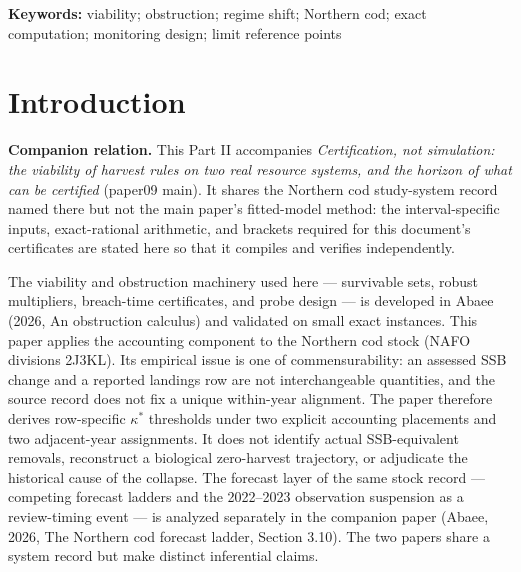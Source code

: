 \documentclass[10pt,twocolumn]{article}
\theoremstyle{plain}
\theoremstyle{remark}
\begin{document}
\textbf{Keywords:} viability; obstruction; regime shift; Northern cod;
exact computation; monitoring design; limit reference points

\section{Introduction}\label{intro}

\noindent\textbf{Companion relation.} This Part II accompanies
\emph{Certification, not simulation: the viability of harvest rules on two real resource systems,
and the horizon of what can be certified} (paper09 main). It shares the Northern cod
study-system record named there but not the main paper's fitted-model method:
the interval-specific inputs, exact-rational arithmetic, and brackets required for
this document's certificates are stated here so that it compiles and verifies independently.



The viability and obstruction machinery used here --- survivable
sets, robust multipliers, breach-time certificates, and probe design ---
is developed in Abaee (2026, An obstruction calculus) and validated on
small exact instances. This paper applies the accounting component to
the Northern cod stock (NAFO divisions 2J3KL). Its empirical issue is
one of commensurability: an assessed SSB change and a reported landings
row are not interchangeable quantities, and the source record does not
fix a unique within-year alignment. The paper therefore derives
row-specific \(\kappa^*\) thresholds under two explicit accounting
placements and two adjacent-year assignments. It does not identify
actual SSB-equivalent removals, reconstruct a biological zero-harvest
trajectory, or adjudicate the historical cause of the collapse. The
forecast layer of the same stock record --- competing forecast ladders
and the 2022--2023 observation suspension as a review-timing event ---
is analyzed separately in the companion paper (Abaee, 2026, The
Northern cod forecast ladder, Section 3.10). The two papers share a
system record but make distinct inferential claims.
\end{document}
